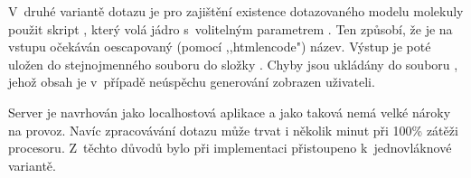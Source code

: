 V~druhé variantě dotazu je pro zajištění existence dotazovaného modelu molekuly
použit skript , který volá jádro  s~volitelným
parametrem . Ten způsobí, že je na vstupu očekáván oescapovaný (pomocí
,,htmlencode") název. Výstup je poté uložen do stejnojmenného souboru do složky
. Chyby jsou ukládány do souboru , jehož obsah je
v~případě neúspěchu generování zobrazen uživateli.

Server je navrhován jako localhostová aplikace a jako taková nemá velké nároky
na provoz. Navíc zpracovávání dotazu může trvat i několik minut při 100\% zátěži
procesoru. Z~těchto důvodů bylo při implementaci přistoupeno k~jednovláknové
variantě.


